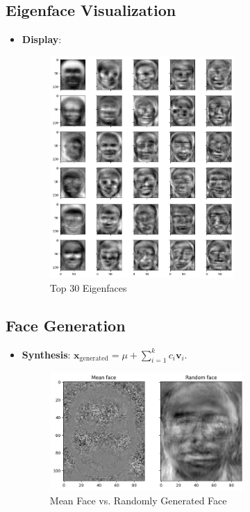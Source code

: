 \documentclass{article}
\begin{document}
	\subsection{Eigenface Visualization}
	\begin{itemize}
		\item \textbf{Display}:
		\begin{figure}[h]
			\centering
			\includegraphics[width=7cm]{eigenfaces.png}
			\caption{Top 30 Eigenfaces}
			\label{fig:eigenfaces}
		\end{figure}
	\end{itemize}
	
	\subsection{Face Generation}
	\begin{itemize}
		\item \textbf{Synthesis}: \(\mathbf{x}_{\text{generated}} = \mu + \sum_{i=1}^{k} c_i \mathbf{v}_i\).
		\begin{figure}[h]
			\centering
			\includegraphics[width=0.7\textwidth]{mean_and_random_face.png}
			\caption{Mean Face vs. Randomly Generated Face}
			\label{fig:random_face}
		\end{figure}
	\end{itemize}
	
\end{document}
